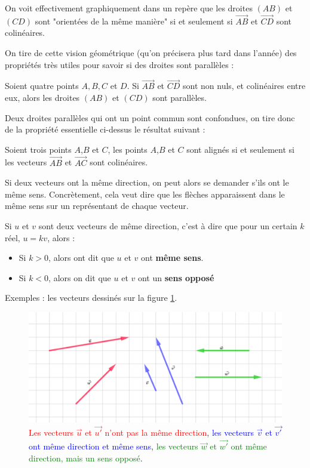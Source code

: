 \documentclass[10pt,a4paper,oneside]{book}
\begin{document}
  On voit effectivement graphiquement dans un repère que les droites $(AB)$ et $(CD)$ sont "orientées de la même manière" si et seulement si $\overrightarrow{AB}$ et $\overrightarrow{CD}$ sont colinéaires. 

On tire de cette vision géométrique (qu'on précisera plus tard dans l'année) des propriétés très utiles pour savoir si des droites sont parallèles :

\begin{prop}
      Soient quatre points $A,B,C$ et $D$. Si $\overrightarrow{AB}$ et $\overrightarrow{CD}$ sont non nuls, et colinéaires entre eux, alors les droites $(AB)$ et $(CD)$ sont parallèles. 
\end{prop}

Deux droites parallèles qui ont un point commun sont confondues, on tire donc de la propriété essentielle ci-dessus le résultat suivant :

\begin{prop}
  Soient trois points $A$,$B$ et $C$, les points $A$,$B$ et $C$ sont alignés si et seulement si les vecteurs $\overrightarrow{AB}$ et $\overrightarrow{AC}$ sont colinéaires.
\end{prop}

Si deux vecteurs ont la même direction, on peut alors se demander s'ils ont le même sens. Concrètement, cela veut dire que les flèches apparaissent dans le même sens sur un représentant de chaque vecteur.

\begin{de}
  Si $u$ et $v$ sont deux vecteurs de même direction, c'est à dire que pour un certain $k$ réel, $u=kv$, alors : 
  \begin{itemize}
    \item Si $k>0$, alors ont dit que $u$ et $v$ ont \textbf{même sens}. 
    \item Si $k<0$, alors on dit que $u$ et $v$ ont un \textbf{sens opposé}
  \end{itemize}
\end{de}

Exemples : les vecteurs dessinés sur la figure \ref{fig:DirectionSens}.

\begin{figure}
  \centering
\includegraphics[width=1.0\textwidth]{Vecteurs-DirectionSens.png}
\caption{\textcolor{red}{Les vecteurs $\vec{u}$ et $\vec{u'}$ n'ont pas la même direction}, 
\textcolor{blue}{les vecteurs $\vec{v}$ et $\vec{v'}$ ont même direction et même sens}, 
\textcolor{green}{les vecteurs $\vec{w}$ et $\vec{w'}$ ont même direction, mais un sens opposé}.}
\label{fig:DirectionSens}
\end{figure}
\end{document}

